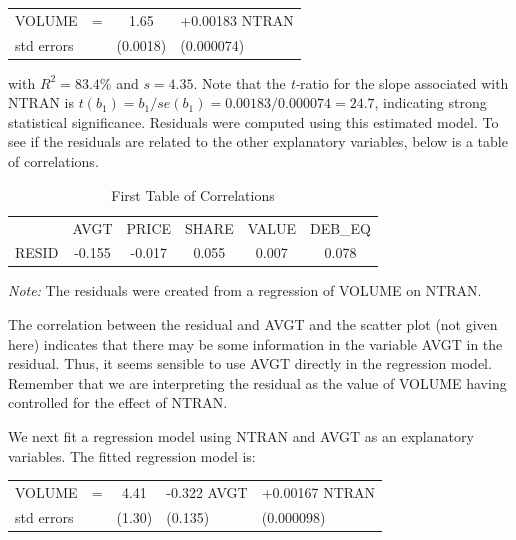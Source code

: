 \begin{center}
\begin{tabular}{lccl}
  VOLUME & = & 1.65 & +0.00183 NTRAN \\
  std errors &  & (0.0018)  & (0.000074) \\
\end{tabular}
\end{center}

\noindent with $R^2=83.4\%$ and $s=4.35$. Note that the
\textit{t-}ratio for the slope associated with NTRAN is
$t(b_1)=b_1/se(b_1)=0.00183/0.000074=24.7$, indicating strong
statistical significance. Residuals were computed using this
estimated model. To see if the residuals are related to the other
explanatory variables, below is a table of correlations.


\begin{table}[h]

\caption{\label{T5:LiquidResidCorr1} First Table of Correlations }
\begin{tabular}{cccccc}
 \hline
& AVGT & PRICE & SHARE & VALUE & DEB\_EQ \\
RESID & -0.155 & -0.017 & 0.055 & 0.007 & 0.078 \\ \hline
\end{tabular}

{\small \textit{Note:} The residuals were created from a regression
of VOLUME on NTRAN.} 
\end{table}

The correlation between the residual and AVGT and the scatter plot (not
given here) indicates that there may be some information in the variable
AVGT in the residual. Thus, it seems sensible to use AVGT directly in the
regression model. Remember that we are interpreting the residual as the
value of VOLUME having controlled for the effect of NTRAN.

We next fit a regression model using NTRAN and AVGT as an explanatory
variables. The fitted regression model is:

\begin{center}
\begin{tabular}{lccll}
  VOLUME     & = & 4.41   & -0.322 AVGT & +0.00167 NTRAN \\
  std errors &   & (1.30) & (0.135)     & (0.000098)     \\
\end{tabular}
\end{center}


